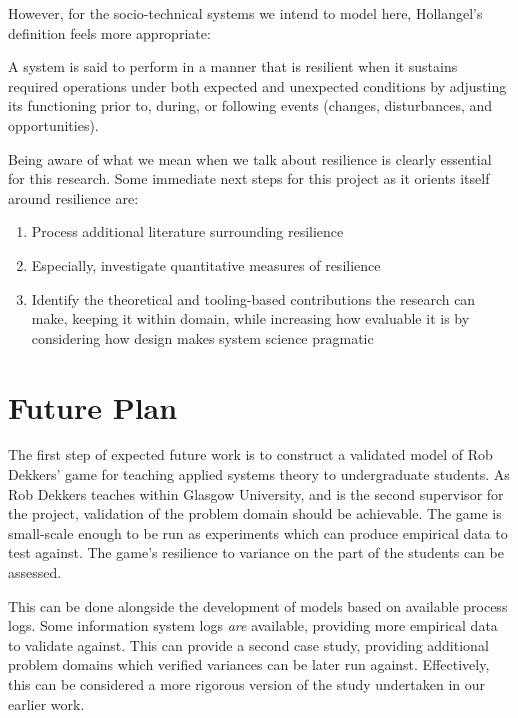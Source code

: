 \documentclass{article}
\begin{document}
However, for the socio-technical systems we intend to model here, Hollangel's
definition feels more appropriate\cite{hollnagel_RAG}:

\begin{displayquote}
   A system is said to perform in a manner that is resilient when it sustains
   required operations under both expected and unexpected conditions by
   adjusting its functioning prior to, during, or following events (changes,
   disturbances, and opportunities).
\end{displayquote}

Being aware of what we mean when we talk about resilience is clearly essential
for this research. Some immediate next steps for this project as it orients
itself around resilience are:

\begin{enumerate}
\item Process additional literature surrounding resilience
\item Especially, investigate quantitative measures of resilience
\item Identify the theoretical and tooling-based contributions the research can
  make, keeping it within domain, while increasing how evaluable it is by
  considering how design makes system science pragmatic
\end{enumerate}


\section{Future Plan}
\label{sec:future_plan}

The first step of expected future work is to construct a validated model of Rob
Dekkers' game for teaching applied systems theory to undergraduate students.
As Rob Dekkers teaches within Glasgow University, and is the second supervisor
for the project, validation of the problem domain should be achievable. The game
is small-scale enough to be run as experiments which can produce empirical data
to test against. The game's resilience to variance on the part of the students
can be assessed.\par

This can be done alongside the development of models based on available process
logs. Some information system logs \emph{are} available, providing more
empirical data to validate against. This can provide a second case study,
providing additional problem domains which verified variances can be later run
against. Effectively, this can be considered a more rigorous version of the
study undertaken in our earlier work\cite{caise_forum_18}.\par
\end{document}
